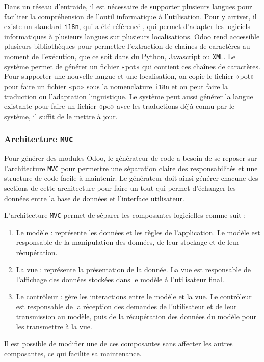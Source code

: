 Dans un réseau d'entraide, il est nécessaire de supporter plusieurs langues pour faciliter la compréhension de l'outil informatique à l'utilisation. Pour y arriver, il existe un standard \texttt{i18n}, qui a été référencé \cite{i18n_wiley}, qui permet d'adapter les logiciels informatiques à plusieurs langues sur plusieurs localisations\cite{wikipedia_i18n}. Odoo rend accessible plusieurs bibliothèques pour permettre l’extraction de chaînes de caractères au moment de l’exécution, que ce soit dans du Python, Javascript ou \texttt{XML}. Le système permet de générer un fichier «pot» qui contient ces chaînes de caractères. Pour supporter une nouvelle langue et une localisation, on copie le fichier «pot» pour faire un fichier «po» sous la nomenclature \texttt{i18n} et on peut faire la traduction ou l’adaptation linguistique. Le système peut aussi générer la langue existante pour faire un fichier «po» avec les traductions déjà connu par le système, il suffit de le mettre à jour.

\subsubsection{Architecture \texttt{MVC}}

Pour générer des modules Odoo, le générateur de code a besoin de se reposer sur l'architecture \texttt{MVC} pour permettre une séparation claire des responsabilités et une structure de code facile à maintenir. Le générateur doit ainsi générer chacune des sections de cette architecture pour faire un tout qui permet d'échanger les données entre la base de données et l'interface utilisateur.

L’architecture \texttt{MVC} permet de séparer les composantes logicielles comme suit : 
\begin{enumerate}
    \item Le modèle : représente les données et les règles de l’application. Le modèle est responsable de la manipulation des données, de leur stockage et de leur récupération.
    \item La vue : représente la présentation de la donnée. La vue est responsable de l’affichage des données stockées dans le modèle à l’utilisateur final.
    \item Le contrôleur : gère les interactions entre le modèle et la vue. Le contrôleur est responsable de la réception des demandes de l’utilisateur et de leur transmission au modèle, puis de la récupération des données du modèle pour les transmettre à la vue.
\end{enumerate}
Il est possible de modifier une de ces composantes sans affecter les autres composantes, ce qui facilite sa maintenance.

